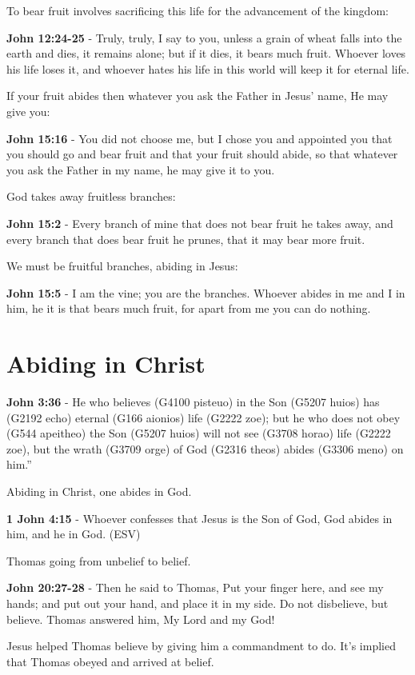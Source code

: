 \documentclass[11pt]{article}
\begin{document}
To bear fruit involves sacrificing this life for the advancement of the kingdom:

\textbf{John 12:24-25} - Truly, truly, I say to you, unless a grain of wheat falls into the earth and dies, it remains alone; but if it dies, it bears much fruit. Whoever loves his life loses it, and whoever hates his life in this world will keep it for eternal life.

If your fruit abides then whatever you ask the Father in Jesus' name, He may give you:

\textbf{John 15:16} - You did not choose me, but I chose you and appointed you that you should go and bear fruit and that your fruit should abide, so that whatever you ask the Father in my name, he may give it to you.

God takes away fruitless branches:

\textbf{John 15:2} - Every branch of mine that does not bear fruit he takes away, and every branch that does bear fruit he prunes, that it may bear more fruit.

We must be fruitful branches, abiding in Jesus:

\textbf{John 15:5} - I am the vine; you are the branches. Whoever abides in me and I in him, he it is that bears much fruit, for apart from me you can do nothing.

\section{Abiding in Christ}
\label{sec:orgc920250}
\textbf{John 3:36} - He who believes (G4100 pisteuo) in the Son (G5207 huios) has (G2192 echo) eternal (G166 aionios) life (G2222 zoe); but he who does not obey (G544 apeitheo) the Son (G5207 huios) will not see (G3708 horao) life (G2222 zoe), but the wrath (G3709 orge) of God (G2316 theos) abides (G3306 meno) on him.”

Abiding in Christ, one abides in God.

\textbf{1 John 4:15} - Whoever confesses that Jesus is the Son of God, God abides in him, and he in God. (ESV)

Thomas going from unbelief to belief.

\textbf{John 20:27-28} - Then he said to Thomas, Put your finger here, and see my hands; and put out your hand, and place it in my side. Do not disbelieve, but believe. Thomas answered him, My Lord and my God!

Jesus helped Thomas believe by giving him a commandment to do. It's implied that Thomas obeyed and arrived at belief.
\end{document}
